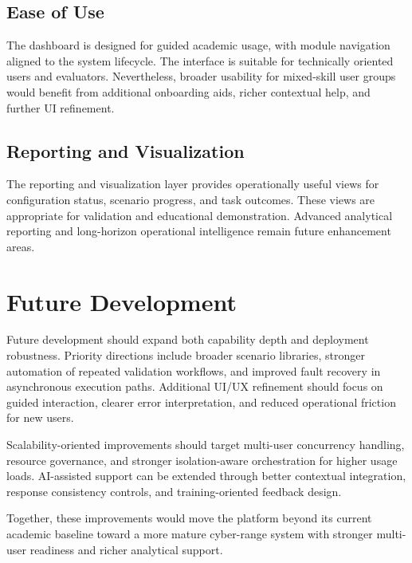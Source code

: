 \subsection{Ease of Use}
The dashboard is designed for guided academic usage, with module navigation aligned to the system lifecycle. The interface is suitable for technically oriented users and evaluators. Nevertheless, broader usability for mixed-skill user groups would benefit from additional onboarding aids, richer contextual help, and further UI refinement.

\subsection{Reporting and Visualization}
The reporting and visualization layer provides operationally useful views for configuration status, scenario progress, and task outcomes. These views are appropriate for validation and educational demonstration. Advanced analytical reporting and long-horizon operational intelligence remain future enhancement areas.

\section{Future Development}
Future development should expand both capability depth and deployment robustness. Priority directions include broader scenario libraries, stronger automation of repeated validation workflows, and improved fault recovery in asynchronous execution paths. Additional UI/UX refinement should focus on guided interaction, clearer error interpretation, and reduced operational friction for new users.

Scalability-oriented improvements should target multi-user concurrency handling, resource governance, and stronger isolation-aware orchestration for higher usage loads. AI-assisted support can be extended through better contextual integration, response consistency controls, and training-oriented feedback design.

Together, these improvements would move the platform beyond its current academic baseline toward a more mature cyber-range system with stronger multi-user readiness and richer analytical support.